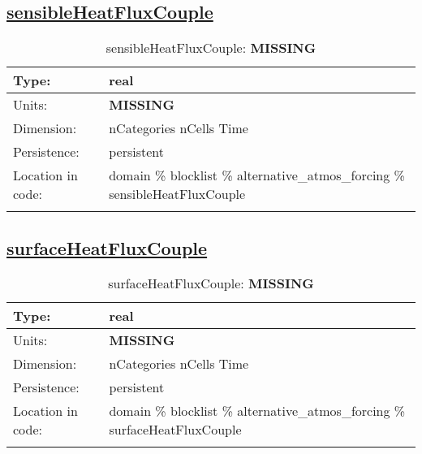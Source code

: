 \subsection[sensibleHeatFluxCouple]{\hyperref[sec:var_tab_alternative_atmos_forcing]{sensibleHeatFluxCouple}}
\label{subsec:var_sec_alternative_atmos_forcing_sensibleHeatFluxCouple}
\begin{center}
\begin{longtable}{| p{2.0in} | p{4.0in} |}
        \hline 
        Type: & real \\
        \hline 
        Units: & {\bf \color{red} MISSING} \\
        \hline 
        Dimension: & nCategories nCells Time \\
        \hline 
        Persistence: & persistent \\
        \hline 
         Location in code: & domain \% blocklist \% alternative\_atmos\_forcing \% sensibleHeatFluxCouple \\
         \hline 
    \caption{sensibleHeatFluxCouple: {\bf \color{red} MISSING}}
\end{longtable}
\end{center}
\subsection[surfaceHeatFluxCouple]{\hyperref[sec:var_tab_alternative_atmos_forcing]{surfaceHeatFluxCouple}}
\label{subsec:var_sec_alternative_atmos_forcing_surfaceHeatFluxCouple}
\begin{center}
\begin{longtable}{| p{2.0in} | p{4.0in} |}
        \hline 
        Type: & real \\
        \hline 
        Units: & {\bf \color{red} MISSING} \\
        \hline 
        Dimension: & nCategories nCells Time \\
        \hline 
        Persistence: & persistent \\
        \hline 
         Location in code: & domain \% blocklist \% alternative\_atmos\_forcing \% surfaceHeatFluxCouple \\
         \hline 
    \caption{surfaceHeatFluxCouple: {\bf \color{red} MISSING}}
\end{longtable}
\end{center}
